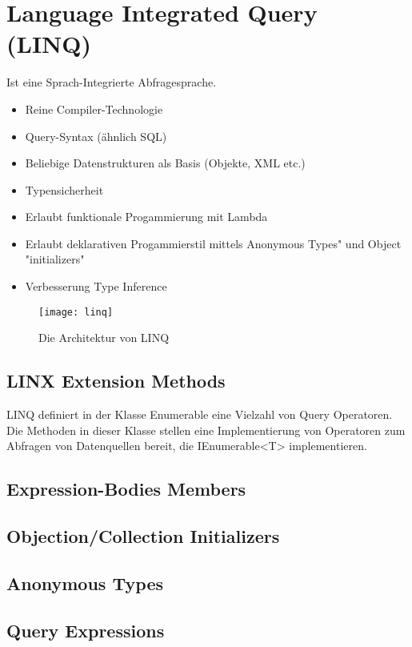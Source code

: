 \section{Language Integrated Query (LINQ)}
Ist eine Sprach-Integrierte Abfragesprache.
\begin{itemize}
	\itemsep -0.5em 
	\item Reine Compiler-Technologie
	\item Query-Syntax (ähnlich SQL)
	\item Beliebige Datenstrukturen als Basis (Objekte, XML etc.)
	\item Typensicherheit
	\item Erlaubt funktionale Progammierung mit Lambda
	\item Erlaubt deklarativen Progammierstil mittels Anonymous Types" und Object "initializers"
	\item Verbesserung Type Inference
\end{itemize}

\begin{figure}[h!]
	\centering
	\texttt{[image: linq]}
  \caption{Die Architektur von LINQ}
\end{figure}


\subsection{LINX Extension Methods}
LINQ definiert in der Klasse Enumerable eine Vielzahl von Query Operatoren. Die Methoden in dieser Klasse stellen eine Implementierung von Operatoren zum Abfragen von Datenquellen bereit, die IEnumerable<T> implementieren. 

\subsection{Expression-Bodies Members}



\subsection{Objection/Collection Initializers}



\subsection{Anonymous Types}




\subsection{Query Expressions}


\pagebreak
